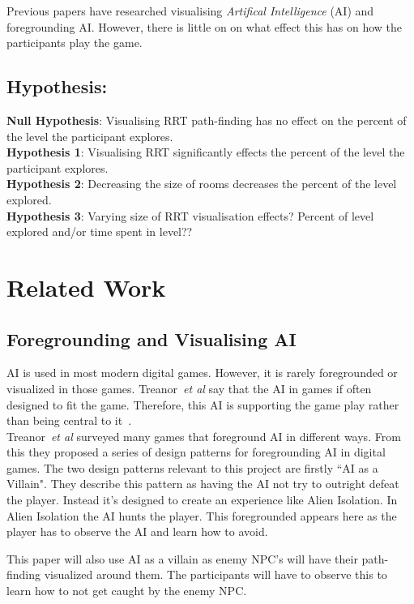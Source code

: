 \documentclass[journal]{IEEEtran}
\begin{document}
Previous papers have researched visualising \textit{Artifical Intelligence} (AI) and foregrounding AI. However, there is little on on what effect this has on how the participants play the game.


\subsection{Hypothesis:}
\textbf{Null Hypothesis}: Visualising RRT path-finding has no effect on the percent of the level the participant explores. \\
\textbf{Hypothesis 1}: Visualising RRT significantly effects the percent of the level the participant explores. \\
\textbf{Hypothesis 2}: Decreasing the size of rooms decreases the percent of the level explored. \\ 
\textbf{Hypothesis 3}: Varying size of RRT visualisation effects? 
Percent of level explored and/or time spent in level??


\section{Related Work}
\subsection{Foregrounding and Visualising AI}
AI is used in most modern digital games. However, it is rarely foregrounded or visualized in those games.  Treanor~\textit{et al} say that the AI in games if often designed to fit the game. Therefore, this AI is supporting the game play rather than being central to it~\cite{treanor2015, eladhari2011}.  \\

Treanor~\textit{et al} surveyed many games that foreground AI in different ways.  From this they proposed a series of design patterns for foregrounding AI in digital games. 
The two design patterns relevant to this project are firstly ``AI as a Villain".  They describe this pattern as having the AI not try to outright defeat the player. Instead it's designed to create an experience like Alien Isolation.  In Alien Isolation the AI hunts the player. This foregrounded appears here as the player has to observe the AI and learn how to avoid. 

This paper will also use AI as a villain as enemy NPC's  will have their path-finding visualized around them. The participants will have to observe this to learn how to not get caught by the enemy NPC.  
\end{document}
